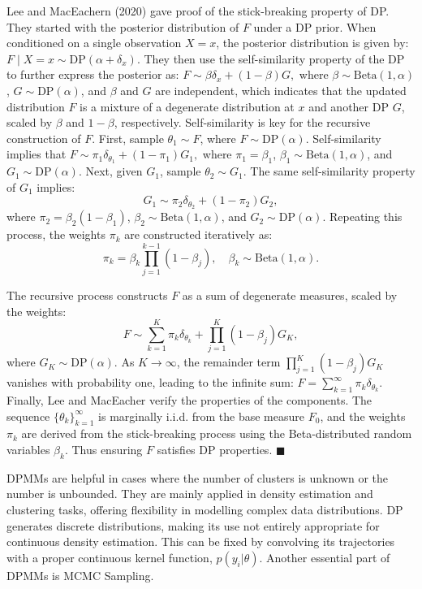 \documentclass[12pt]{report} %
\begin{document}
Lee and MacEachern (2020) gave proof of the stick-breaking property of DP. They started with the posterior distribution of \( F \) under a DP prior. When conditioned on a single observation \( X = x \), the posterior distribution is given by: $F \mid X = x \sim \text{DP}(\alpha + \delta_x).$
They then use the self-similarity property of the DP to further express the posterior as:
$F \sim \beta \delta_x + (1 - \beta) G,$
where \( \beta \sim \text{Beta}(1, \alpha) \), \( G \sim \text{DP}(\alpha) \), and \( \beta \) and \( G \) are independent, which indicates that the updated distribution \( F \) is a mixture of a degenerate distribution at \( x \) and another DP \( G \), scaled by \( \beta \) and \( 1 - \beta \), respectively. Self-similarity is key for the recursive construction of \( F \). First, sample \( \theta_1 \sim F \), where \( F \sim \text{DP}(\alpha) \). Self-similarity implies that $F \sim \pi_1 \delta_{\theta_1} + (1 - \pi_1) G_1,$
where \( \pi_1 = \beta_1 \), \( \beta_1 \sim \text{Beta}(1, \alpha) \), and \( G_1 \sim \text{DP}(\alpha) \). Next, given \( G_1 \), sample \( \theta_2 \sim G_1 \). The same self-similarity property of \( G_1 \) implies:
\[
G_1 \sim \pi_2 \delta_{\theta_2} + (1 - \pi_2) G_2,
\]
where \( \pi_2 = \beta_2 (1 - \beta_1) \), \( \beta_2 \sim \text{Beta}(1, \alpha) \), and \( G_2 \sim \text{DP}(\alpha) \). Repeating this process, the weights \( \pi_k \) are constructed iteratively as:
\[
\pi_k = \beta_k \prod_{j=1}^{k-1} (1 - \beta_j), \quad \beta_k \sim \text{Beta}(1, \alpha).
\]

\noindent The recursive process constructs \( F \) as a sum of degenerate measures, scaled by the weights:
\[
F \sim \sum_{k=1}^K \pi_k \delta_{\theta_k} + \prod_{j=1}^K (1 - \beta_j) G_K,
\]
where \( G_K \sim \text{DP}(\alpha) \). As \( K \to \infty \), the remainder term \( \prod_{j=1}^K (1 - \beta_j) G_K \) vanishes with probability one, leading to the infinite sum: $F = \sum_{k=1}^\infty \pi_k \delta_{\theta_k}.$ Finally, Lee and MacEacher verify the properties of the components. The sequence \( \{ \theta_k \}_{k=1}^\infty \) is marginally i.i.d. from the base measure \( F_0 \), and the weights \( \pi_k \) are derived from the stick-breaking process using the Beta-distributed random variables \( \beta_k \). Thus ensuring \( F \) satisfies DP properties. $\blacksquare$

DPMMs are helpful in cases where the number of clusters is unknown or the number is unbounded. They are mainly applied in density estimation and clustering tasks, offering flexibility in modelling complex data distributions. DP generates discrete distributions, making its use not entirely appropriate for continuous density estimation.\cite{perrakis2024nonparametric} This can be fixed by convolving its trajectories with a proper continuous kernel function, \( p(y_i | \theta) \).\cite{perrakis2024nonparametric} Another essential part of DPMMs is MCMC Sampling.
\end{document}

